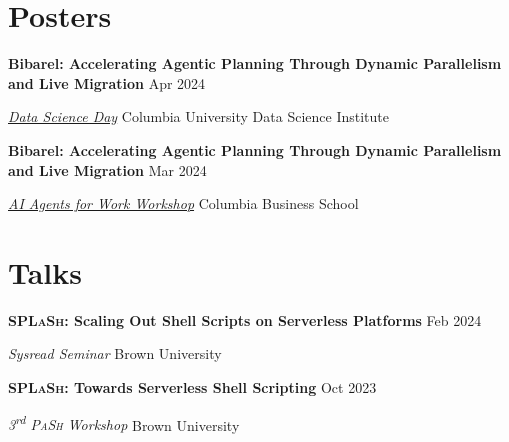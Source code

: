\documentclass[margin,11pt]{resume}
\newcommand{\subsectionVSpace}{\vspace{3.5ex}\xspace}
\newcommand{\sectionVSpace}{\vspace{1ex}\xspace} %
\newcommand{\pash}{\textsc{PaSh}\xspace}
\newcommand{\sectionVSpaceCorrection}{\vspace{-3.5ex}} %
\newcommand{\splash}{\textsc{SPLaSh}\xspace}
\newcommand{\header}[1]{\textbf{#1}\xspace}
\newcommand{\event}[1]{\textit{#1}\xspace}
\newcommand{\ordinal}[1]{\textsuperscript{#1}\xspace}
\newcommand{\place}[1]{#1\xspace}
\newcommand{\poster}[1]{\header{#1}\xspace}
\newcommand{\singleDate}[1]{#1\xspace}
\newcommand{\talk}[1]{\header{#1}\xspace}
\newenvironment{rSubsection}{}{\par\subsectionVSpace}
\newenvironment{rSection}[1]{\sectionVSpaceCorrection\section{#1}\xspace}{\sectionVSpace\par}
\begin{document}
\begin{resume}
	\begin{rSection}{Posters}
		\begin{rSubsection}
			\poster{Bibarel: Accelerating Agentic Planning Through Dynamic Parallelism and Live Migration} \hfill Apr 2024

			\event{\href{https://datascience.columbia.edu/event/data-science-day-2025/}{Data Science Day}} \hfill \place{Columbia University Data Science Institute}
		\end{rSubsection}

		\begin{rSubsection}
			\poster{Bibarel: Accelerating Agentic Planning Through Dynamic Parallelism and Live Migration} \hfill Mar 2024

			\event{\href{https://daplab.cs.columbia.edu/workshop/}{AI Agents for Work Workshop}} \hfill \place{Columbia Business School}
		\end{rSubsection}
	\end{rSection}

	\begin{rSection}{Talks}


		\begin{rSubsection}
			\talk{\splash: Scaling Out Shell Scripts on Serverless Platforms} \hfill \singleDate{Feb 2024}

			\event{Sysread Seminar} \hfill \place{Brown University}
		\end{rSubsection}



		\begin{rSubsection}
			\talk{\splash: Towards Serverless Shell Scripting} \hfill \singleDate{Oct 2023}

			\event{3\ordinal{rd} \pash Workshop} \hfill \place{Brown University}
		\end{rSubsection}
	\end{rSection}


\end{resume}
\end{document}
